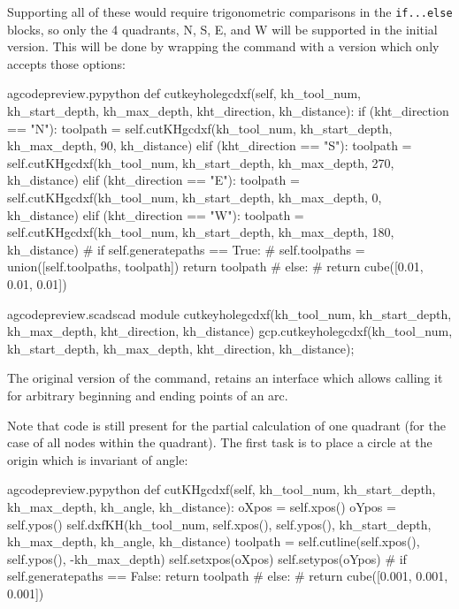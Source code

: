 \documentclass{ltxdoc}
\begin{document}
Supporting all of these would require trigonometric comparisons in the \verb|if...else| blocks, so only the 4 quadrants, N, S, E, and W will be supported in the initial version. This will be done by wrapping the command with a version which only accepts those options: 

\lstset{firstnumber=\thegcpy}
\begin{writecode}{a}{gcodepreview.py}{python}
    def cutkeyholegcdxf(self, kh_tool_num, kh_start_depth, kh_max_depth, kht_direction, kh_distance):   
        if (kht_direction == "N"): 
            toolpath = self.cutKHgcdxf(kh_tool_num, kh_start_depth, kh_max_depth, 90, kh_distance)
        elif (kht_direction == "S"):
            toolpath = self.cutKHgcdxf(kh_tool_num, kh_start_depth, kh_max_depth, 270, kh_distance)
        elif (kht_direction == "E"):
            toolpath = self.cutKHgcdxf(kh_tool_num, kh_start_depth, kh_max_depth, 0, kh_distance)
        elif (kht_direction == "W"):
            toolpath = self.cutKHgcdxf(kh_tool_num, kh_start_depth, kh_max_depth, 180, kh_distance)
#        if self.generatepaths == True:
#            self.toolpaths = union([self.toolpaths, toolpath])
        return toolpath
#        else:
#            return cube([0.01, 0.01, 0.01])

\end{writecode}
\addtocounter{gcpy}{15}

\lstset{firstnumber=\thegcpscad}
\begin{writecode}{a}{gcodepreview.scad}{scad}
module cutkeyholegcdxf(kh_tool_num, kh_start_depth, kh_max_depth, kht_direction, kh_distance){
    gcp.cutkeyholegcdxf(kh_tool_num, kh_start_depth, kh_max_depth, kht_direction, kh_distance);
}

\end{writecode}
\addtocounter{gcpscad}{4}

The original version of the command,  retains an interface which allows calling it for arbitrary beginning and ending points of an arc. 

Note that code is still present for the partial calculation of one quadrant (for the case of all nodes within the quadrant). The first task is to place a circle at the origin which is invariant of angle:
 
\lstset{firstnumber=\thegcpy}
\begin{writecode}{a}{gcodepreview.py}{python}
    def cutKHgcdxf(self, kh_tool_num, kh_start_depth, kh_max_depth, kh_angle, kh_distance):
        oXpos = self.xpos()
        oYpos = self.ypos()
        self.dxfKH(kh_tool_num, self.xpos(), self.ypos(), kh_start_depth, kh_max_depth, kh_angle, kh_distance)
        toolpath = self.cutline(self.xpos(), self.ypos(), -kh_max_depth)
        self.setxpos(oXpos)
        self.setypos(oYpos)
#        if self.generatepaths == False:
        return toolpath
#        else: 
#            return cube([0.001, 0.001, 0.001])

\end{writecode}
\addtocounter{gcpy}{12}
\end{document}

